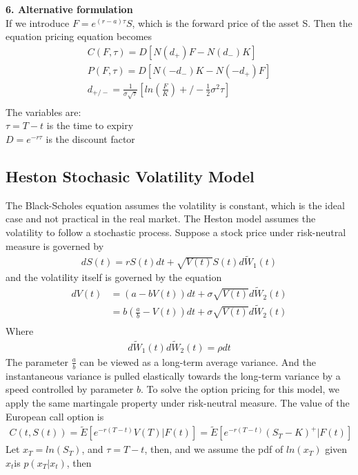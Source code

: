 \documentclass[a4paper]{article}
\begin{document}
{\bf 6. Alternative formulation}\\
If we introduce $F = e^{(r-a)\tau} S$, which is the forward price of the asset S. Then the equation pricing equation becomes
\begin{align*}
	C(F,\tau)= D[N(d_+)F - N(d_-)K] \\
	P(F,\tau)= D[N(-d_-)K - N(-d_+)F] \\
	d_{+/-} = \frac{1}{\sigma \sqrt{\tau}}[ln(\frac{F}{K})+/-\frac{1}{2}\sigma^2 \tau] \\
\end{align*}
The variables are:\\
$\tau = T - t$ is the time to expiry\\
$D = e^{-r\tau}$ is the discount factor \\
\subsection{Heston Stochasic Volatility Model}
The Black-Scholes equation assumes the volatility is constant, which is the ideal case and not practical in the real market. The Heston model\cite{heston} assumes the volatility to follow a stochastic process. Suppose a stock price under risk-neutral measure is governed by
\begin{align}
	dS(t) = rS(t)dt + \sqrt{V(t)} S(t) d \tilde W_1(t)
\end{align}
and the volatility itself is governed by the equation
\begin{align}
	dV(t) & = (a -bV(t))dt + \sigma \sqrt{V(t)} d \tilde W_2(t) \\
	      & = b(\frac{a}{b} -V(t))dt + \sigma \sqrt{V(t)} d \tilde W_2(t) \\
\end{align}
Where 
\begin{align*}
	d\tilde W_1(t) d\tilde W_2(t) = \rho dt
\end{align*}
The parameter $\frac{a}{b}$ can be viewed as a long-term average variance. And the instantaneous variance is pulled elastically towards the long-term variance by a speed controlled by parameter $b$. To solve the option pricing for this model, we apply the same martingale property under risk-neutral measure. The value of the European call option is
\begin{align*}
	C(t, S(t)) = \tilde E[e^{-r(T-t)}V(T)| F(t)] = \tilde E[e^{-r(T-t)}(S_T - K)^{+}| F(t)]
\end{align*}
Let $x_T = ln(S_T)$, and $\tau = T - t$, then, and we assume the pdf of $ln(x_T)$ given $x_t$is $p(x_T | x_t)$, then
\end{document}

